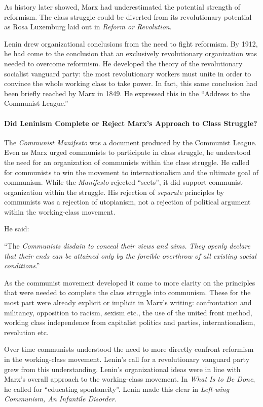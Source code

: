 As history later showed, Marx had underestimated the potential strength of reformism. The class struggle could be diverted from its revolutionary potential as Rosa Luxemburg laid out in \emph{Reform or Revolution}.

Lenin drew organizational conclusions from the need to fight reformism. By 1912, he had come to the conclusion that an exclusively revolutionary organization was needed to overcome reformism. He developed the theory of the revolutionary socialist vanguard party: the most revolutionary workers must unite in order to convince the whole working class to take power. In fact, this same conclusion had been briefly reached by Marx in 1849. He expressed this in the ``Address to the Communist League.''

\paragraph{Did Leninism Complete or Reject Marx's Approach to Class Struggle?}

The \emph{Communist Manifesto} was a document produced by the Communist League. Even as Marx urged communists to participate in class struggle, he understood the need for an organization of communists within the class struggle. He called for communists to win the movement to internationalism and the ultimate goal of communism. While the \emph{Manifesto} rejected ``sects'', it did support communist organization within the struggle. His rejection of \emph{separate} principles by communists was a rejection of utopianism, not a rejection of political argument within the working-class movement.

He said:

``The \emph{Communists disdain to conceal their views and aims. They openly declare that their ends can be attained only by the forcible overthrow of all existing social conditions}.''

As the communist movement developed it came to more clarity on the principles that were needed to complete the class struggle into communism. These for the most part were already explicit or implicit in Marx's writing: confrontation and militancy, opposition to racism, sexism etc., the use of the united front method, working class independence from capitalist politics and parties, internationalism, revolution etc.

Over time communists understood the need to more directly confront reformism in the working-class movement. Lenin's call for a revolutionary vanguard party grew from this understanding. Lenin's organizational ideas were in line with Marx's overall approach to the working-class movement. In \emph{What Is to Be Done}, he called for ``educating spontaneity''. Lenin made this clear in \emph{Left-wing Communism, An Infantile Disorder}.

